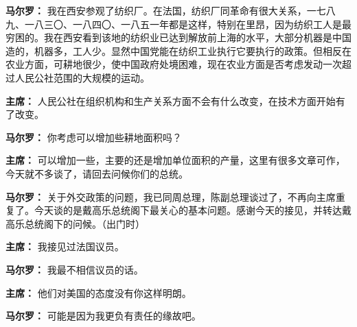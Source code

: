\begin{duihua}
\item[\textbf{马尔罗：}] 我在西安参观了纺织厂。在法国，纺织厂同革命有很大关系，一七八九、一八三〇、一八四〇、一八五一年都是这样，特别在里昂，因为纺织工人是最穷困的。我在西安看到该地的纺织业已达到解放前上海的水平，大部分机器是中国造的，机器多，工人少。显然中国党能在纺织工业执行它要执行的政策。但相反在农业方面，可耕地很少，使中国政府处境困难，现在农业方面是否考虑发动一次超过人民公社范围的大规模的运动。

\item[\textbf{主席：}] 人民公社在组织机构和生产关系方面不会有什么改变，在技术方面开始有了改变。

\item[\textbf{马尔罗：}] 你考虑可以增加些耕地面积吗？

\item[\textbf{主席：}] 可以增加一些，主要的还是增加单位面积的产量，这里有很多文章可作，今天就不多谈了，请回去问候你们的总统。

\item[\textbf{马尔罗：}] 关于外交政策的问题，我已同周总理，陈副总理谈过了，不再向主席重复了。今天谈的是戴高乐总统阁下最关心的基本问题。感谢今天的接见，并转达戴高乐总统阁下的问候。（出门时）

\item[\textbf{主席：}] 我接见过法国议员。

\item[\textbf{马尔罗：}] 我最不相信议员的话。

\item[\textbf{主席：}] 他们对美国的态度没有你这样明朗。

\item[\textbf{马尔罗：}] 可能是因为我更负有责任的缘故吧。
\end{duihua}
